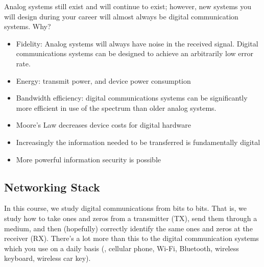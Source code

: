 Analog systems still exist and will continue to exist; however, new systems you will design during your career will almost always be digital communication systems. Why?
\begin{itemize}
  \item Fidelity: Analog systems will always have noise in the received signal.  Digital communications systems can be designed to achieve an arbitrarily low error rate.
  \item Energy: transmit power, and device power consumption
  \item Bandwidth efficiency: digital communications systems can be significantly more efficient in use of the spectrum than older analog systems.
  \item Moore's Law decreases device costs for digital hardware
  \item Increasingly the information needed to be transferred is fundamentally digital
  \item More powerful information security is possible
\end{itemize}

\subsection{Networking Stack}

In this course, we study digital communications from bits to bits.  That is, we study how to take ones and zeros from a transmitter (TX), send them through a medium, and then (hopefully) correctly identify the same ones and zeros at the receiver (RX).  There's a lot more than this to the digital communication systems which you use on a daily basis (\eg, cellular phone, Wi-Fi, Bluetooth, wireless keyboard, wireless car key).

